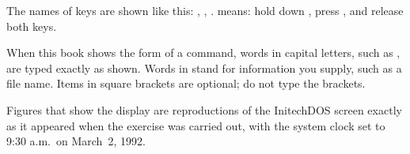 The names of keys are shown like this: ,
, .   means: hold down ,
press , and release both keys.

When this book shows the form of a command, words in
capital letters, such as , are typed exactly as shown.  Words in
 stand for information you supply, such as a file name.  Items
in square brackets  are optional; do not type the
brackets.

Figures that show the display are reproductions of the
InitechDOS screen exactly as it appeared when the exercise was carried out,
with the system clock set to 9:30 a.m.\ on March~2, 1992.
